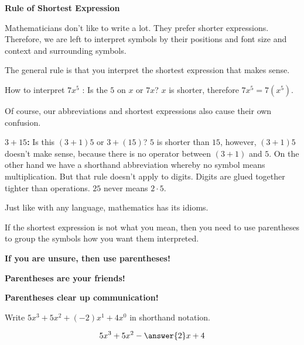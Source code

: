 \documentclass{ximera}
\begin{document}
\begin{warning} \textbf{\textcolor{red!90!darkgray}{Rule of Shortest Expression}} 

Mathematicians don't like to write a lot.  They prefer shorter expressions.  Therefore, we are left to interpret symbols by their positions and font size and context and surrounding symbols.

The general rule is that you interpret the shortest expression that makes sense.


How to interpret $7x^5$ : Is the $5$ on $x$ or $7x$?  $x$ is shorter, therefore $7x^5 = 7 (x^5)$.

Of course, our abbreviations and shortest expressions also cause their own confusion.

\textbf{$3+15$:} Is this $(3+1)5$ or $3+(15)$?  $5$ is shorter than $15$, however, $(3+1)5$ doesn't make sense, because there is no operator between $(3+1)$ and $5$.  On the other hand we have a shorthand abbreviation whereby no symbol means multiplication.  But that rule doesn't apply to digits.  Digits are glued together tighter than operations. $25$ never means $2 \cdot 5$.

Just like with any language, mathematics has its idioms.

If the shortest expression is not what you mean, then you need to use parentheses to group the symbols how you want them interpreted.

\begin{center}
\textbf{\textcolor{red!90!darkgray}{If you are unsure, then use parentheses!}} 
\end{center}


\begin{center}
\textbf{\textcolor{red!90!darkgray}{Parentheses are your friends!}} 
\end{center}


\begin{center}
\textbf{\textcolor{red!90!darkgray}{Parentheses clear up communication!}} 
\end{center}



\end{warning}



\begin{question}

Write $5 x^3 + 5 x^2 + (-2) x^1 + 4 x^0$ in shorthand notation.


\[
5 x^3 + 5 x^2 - \answer{2} x + 4  
\]

\end{question}
\end{document}
